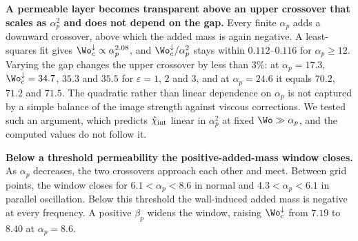 \textbf{A permeable layer becomes transparent above an upper crossover that scales as $\alpha_p^2$ and does not depend on the
gap.} Every finite $\alpha_p$ adds a downward crossover, above which the added mass is again negative. A least-squares
fit gives $\Wo_c^{\downarrow}\propto\alpha_p^{2.08}$, and $\Wo_c^{\downarrow}/\alpha_p^2$ stays within $0.112$--$0.116$
for $\alpha_p\ge12$. Varying the gap changes the upper crossover by less than $3\%$: at $\alpha_p=17.3$,
$\Wo_c^{\downarrow}=34.7$, $35.3$ and $35.5$ for $\varepsilon=1$, $2$ and $3$, and at $\alpha_p=24.6$ it equals $70.2$,
$71.2$ and $71.5$.  The quadratic rather than linear
dependence on $\alpha_p$ is not captured by a simple balance of the image strength against viscous corrections. We
tested such an argument, which predicts $\hat\chi_{\rm int}$ linear in $\alpha_p^2$ at fixed $\Wo\gg\alpha_p$, and the
computed values do not follow it. 

\textbf{Below a threshold permeability the positive-added-mass window closes.} As $\alpha_p$ decreases, the two
crossovers approach each other and meet. Between grid points, the window closes for $6.1<\alpha_p<8.6$ in normal and
$4.3<\alpha_p<6.1$ in parallel oscillation. Below this threshold the wall-induced added mass is negative at every
frequency. A positive $\beta_p$ widens the window, raising $\Wo_c^{\downarrow}$ from $7.19$ to $8.40$ at
$\alpha_p=8.6$.

